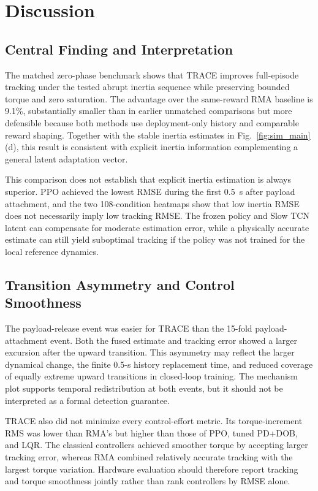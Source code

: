 \section{Discussion}

\subsection{Central Finding and Interpretation}

The matched zero-phase benchmark shows that TRACE improves full-episode tracking under the tested abrupt inertia sequence while preserving bounded torque and zero saturation. The advantage over the same-reward RMA baseline is 9.1\%, substantially smaller than in earlier unmatched comparisons but more defensible because both methods use deployment-only history and comparable reward shaping. Together with the stable inertia estimates in Fig.~\ref{fig:sim_main}(d), this result is consistent with explicit inertia information complementing a general latent adaptation vector.

This comparison does not establish that explicit inertia estimation is always superior. PPO achieved the lowest RMSE during the first 0.5~s after payload attachment, and the two 108-condition heatmaps show that low inertia RMSE does not necessarily imply low tracking RMSE. The frozen policy and Slow TCN latent can compensate for moderate estimation error, while a physically accurate estimate can still yield suboptimal tracking if the policy was not trained for the local reference dynamics.

\subsection{Transition Asymmetry and Control Smoothness}

The payload-release event was easier for TRACE than the 15-fold payload-attachment event. Both the fused estimate and tracking error showed a larger excursion after the upward transition. This asymmetry may reflect the larger dynamical change, the finite 0.5-s history replacement time, and reduced coverage of equally extreme upward transitions in closed-loop training. The mechanism plot supports temporal redistribution at both events, but it should not be interpreted as a formal detection guarantee.

TRACE also did not minimize every control-effort metric. Its torque-increment RMS was lower than RMA's but higher than those of PPO, tuned PD+DOB, and LQR. The classical controllers achieved smoother torque by accepting larger tracking error, whereas RMA combined relatively accurate tracking with the largest torque variation. Hardware evaluation should therefore report tracking and torque smoothness jointly rather than rank controllers by RMSE alone.

